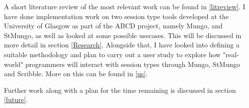  A short literature review of the most relevant work can be found in \ref{litreview}. I have done implementation work on two session type tools developed at the University of Glasgow as part of the ABCD project\cite{abcd}, namely Mungo, and StMungo\cite{kouzapas16}, as well as looked at some possible usecases. This will be discussed in more detail in section \ref{Research}. Alongside that, I have looked into defining a suitable methodology and plan to carry out a user study to explore how "real-world" programmers will interact with session types through Mungo, StMungo and Scribble. More on this can be found in \ref{us}.

Further work along with a plan for the time remaining is discussed in section \ref{future}.
